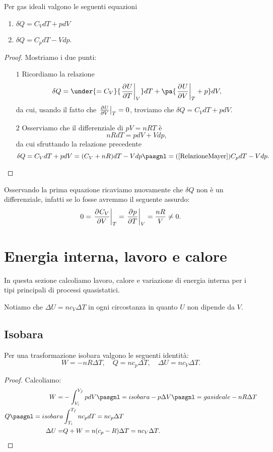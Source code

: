 \begin{proposition}\label{CaloreInfinitesimaleConCapacita}
Per gas ideali valgono le seguenti equazioni
\begin{enumerate}
\item $\delta Q=C_VdT+pdV$
\item $\delta Q=C_p dT-Vdp$.
\end{enumerate}
\end{proposition}
\begin{proof}
Mostriamo i due punti:
\setlength{\leftmargini}{0cm}
\begin{itemize}
\item[$\boxed{1}$] Ricordiamo la relazione \[\delta Q=\under{=C_V}{\ppb TUV} dT+\pa{{\ppb VUT}+p}dV,\]
da cui, usando il fatto che $\ppb VUT=0$, troviamo che $\delta Q=C_V dT+pdV$.
\item[$\boxed{2}$] Osserviamo che il differenziale di $pV=nRT$ \`e
\[nRdT=pdV+Vdp,\]
da cui sfruttando la relazione precedente
\[\delta Q=C_VdT+pdV=({C_V+nR})dT-Vdp\pasgnl={(\ref{RelazioneMayer})}C_p dT-Vdp.\]
\end{itemize}
\setlength{\leftmargini}{0.5cm}
\end{proof}
\begin{remark}
Osservando la prima equazione ricaviamo nuovamente che $\delta Q$ non \`e un differenziale, infatti se lo fosse avremmo il seguente assurdo:
\[0=\ppb V{C_V}T=\ppb TpV=\frac{nR}V\neq 0.\]
\end{remark}


\section{Energia interna, lavoro e calore}

\noindent In questa sezione calcoliamo lavoro, calore e variazione di energia interna per i tipi principali di processi quasistatici.\medskip

\noindent Notiamo che $\Delta U=nc_V\Delta T$ in ogni circostanza in quanto $U$ non dipende da $V$.
\subsection{Isobara}
\begin{proposition}\label{EnergieIsobara}
Per una trasformazione isobara valgono le seguenti identit\`a:
\[W=-nR\Delta T,\quad
Q=nc_p\Delta T,\quad
\Delta U=nc_V\Delta T.\]
\end{proposition}
\begin{proof}
Calcoliamo:
\begin{align*}
W=&-\int_{V_i}^{V_f}pdV\pasgnl={isobara}-p\Delta V\pasgnl={gas ideale}-nR\Delta T\\
Q\pasgnl={isobara}&\int_{T_i}^{T_f}nc_pdT=nc_p\Delta T\\
\Delta U=&Q+W=n(c_p-R)\Delta T=nc_V\Delta T.
\end{align*}
\end{proof}

